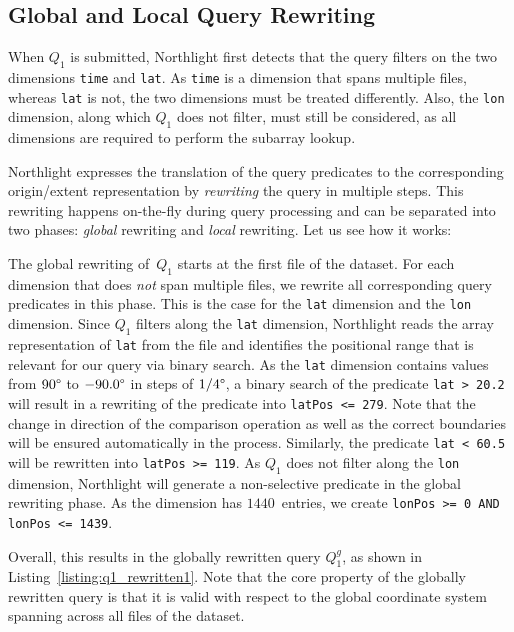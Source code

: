\documentclass[conference]{IEEEtran}
\newcommand{\system}{Northlight}
\newcommand{\smalltt}[1]{{\texttt{\small #1}}}
\begin{document}
\subsection{Global and Local Query Rewriting}
\label{sssec:convex_workflow}

When $Q_1$ is submitted, \system{} first detects that the query filters on the two dimensions \smalltt{time} and \smalltt{lat}. As \smalltt{time} is a dimension that spans multiple files, whereas \smalltt{lat} is not, the two dimensions must be treated differently. Also, the \smalltt{lon} dimension, along which $Q_1$ does not filter, must still be considered, as all dimensions are required to perform the subarray lookup.

\system{} expresses the translation of the query predicates to the corresponding origin/extent representation by \textit{rewriting} the query in multiple steps. This rewriting happens on-the-fly during query processing and can be separated into two phases: \textit{global} rewriting and \textit{local} rewriting. Let us see how it works:

The global rewriting of~$Q_1$ starts at the first file of the dataset. For each dimension that does \textit{not} span multiple files, we rewrite all corresponding query predicates in this phase. 
This is the case for the \smalltt{lat} dimension and the \smalltt{lon} dimension. 
Since $Q_1$ filters along the \smalltt{lat} dimension, \system{} reads the array representation of \smalltt{lat} from the file and identifies the positional range that is relevant for our query via binary search. 
As the \smalltt{lat} dimension contains values from $90\degree$ to $-90.0\degree$ in steps of $1/4\degree$, a binary search of the predicate \smalltt{lat~>~20.2} will result in a rewriting of the predicate into \smalltt{latPos~<=~279}. Note that the change in direction of the comparison operation as well as the correct boundaries will be ensured automatically in the process. Similarly, the predicate \smalltt{lat~<~60.5} will be rewritten into \smalltt{latPos~>=~119}. 
As $Q_1$ does not filter along the \smalltt{lon} dimension, \system{} will generate a non-selective predicate in the global rewriting phase. As the dimension has $1440$~entries, we create \smalltt{lonPos~>=~0 AND lonPos~<=~1439}.

Overall, this results in the globally rewritten query $Q_1^{g}$, as shown in Listing~\ref{listing:q1_rewritten1}. 
Note that the core property of the globally rewritten query is that it is valid with respect to the global coordinate system spanning across all files of the dataset.
\end{document}
